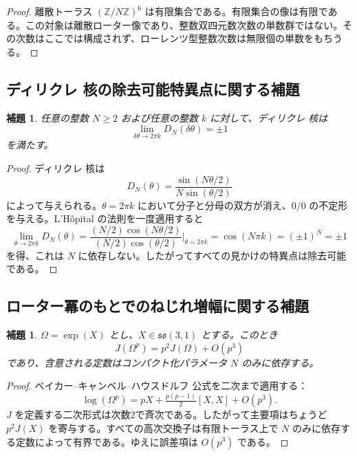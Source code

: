 \documentclass[a4paper]{article}
\newtheorem{lemma}[theorem]{補題}
\theoremstyle{definition}
\theoremstyle{remark}
\begin{document}
\begin{proof}
離散トーラス \( (\mathbb{Z}/N\mathbb{Z})^6 \) は有限集合である。有限集合の像は有限である。この対象は離散ローター像であり、整数双四元数次数の単数群ではない。その次数はここでは構成されず、ローレンツ型整数次数は無限個の単数をもちうる。
\end{proof}

\subsection{ディリクレ 核の除去可能特異点に関する補題}

\begin{lemma}
任意の整数 \( N \geq 2 \) および任意の整数 \( k \) に対して、ディリクレ 核は
\[
\lim_{\delta\theta \to 2\pi k} D_N(\delta\theta) = \pm 1
\]
を満たす。
\end{lemma}

\begin{proof}
ディリクレ 核は
\[
D_N(\theta) = \frac{\sin(N\theta/2)}{N\sin(\theta/2)}
\]
によって与えられる。\(\theta = 2\pi k\) において分子と分母の双方が消え、\( 0/0 \) の不定形を与える。L'Hôpital の法則を一度適用すると
\[
\lim_{\theta \to 2\pi k} D_N(\theta) = \frac{(N/2)\cos(N\theta/2)}{(N/2)\cos(\theta/2)} \Big|_{\theta=2\pi k} = \cos(N\pi k) = (\pm 1)^N = \pm 1
\]
を得、これは \( N \) に依存しない。したがってすべての見かけの特異点は除去可能である。
\end{proof}

\subsection{ローター冪のもとでのねじれ増幅に関する補題}

\begin{lemma}
\(\Omega = \exp(X)\) とし、\( X \in \mathfrak{so}(3,1) \) とする。このとき
\[
J(\Omega^p) = p^2 J(\Omega) + O(p^3)
\]
であり、含意される定数はコンパクト化パラメータ \( N \) のみに依存する。
\end{lemma}

\begin{proof}
ベイカー–キャンベル–ハウスドルフ 公式を二次まで適用する：
\[
\log(\Omega^p) = pX + \tfrac{p(p-1)}{2}[X,X] + O(p^3).
\]
\( J \) を定義する二次形式は次数2で斉次である。したがって主要項はちょうど \( p^2 J(X) \) を寄与する。すべての高次交換子は有限トーラス上で \( N \) のみに依存する定数によって有界である。ゆえに誤差項は \( O(p^3) \) である。
\end{proof}
\end{document}
